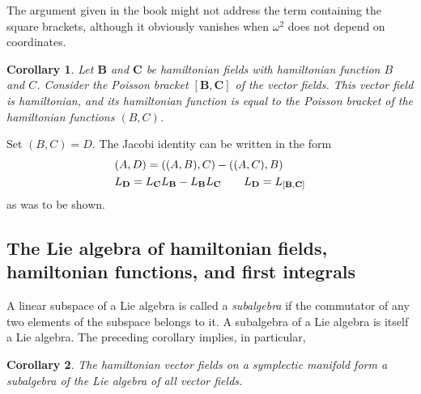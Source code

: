 \documentclass[leqno]{book}
\numberwithin{equation}{section}
\theoremstyle{plain}
\newtheorem{cor}{Corollary}
\let\oldendproof\endproof
\renewenvironment{proof}[1][\proofname]{%
  \oldproof[\textsc{#1}]%
}{\oldendproof}
\theoremstyle{definition}
\theoremstyle{remark}
\theoremstyle{smallcap}
\numberwithin{prob}{section}
\begin{document}
\begin{proof}[Proof of the Jacobi identity]
{    The argument given in the book might not address the term
    containing the square brackets,
    although it obviously vanishes when $\omega^2$ does not depend on
    coordinates.
  }
\end{proof}

\begin{cor}
  Let $\mathbf B$ and $\mathbf C$ be hamiltonian fields
  with hamiltonian function $B$ and $C$.
  Consider the Poisson bracket $[\mathbf B, \mathbf C]$
  of the vector fields.
  This vector field is hamiltonian,
  and its hamiltonian function is equal to the Poisson bracket
  of the hamiltonian functions $(B, C)$.
\end{cor}

\begin{proof}
  Set $(B, C) = D$.
  The Jacobi identity can be written in the form
  \begin{align}
    &(A, D) = ((A, B), C) - ((A, C), B)
    \label{eq:jacobi_D} \\
    &L_\mathbf{D} = L_\mathbf{C} L_\mathbf{B} - L_\mathbf{B} L_\mathbf{C}
    \qquad L_\mathbf{D} = L_{[\mathbf B, \mathbf C]}
    \notag
  \end{align}
  as was to be shown.

\end{proof}


\subsection{The Lie algebra of hamiltonian fields,
hamiltonian functions, and first integrals}

A linear subspace of a Lie algebra is called a \emph{subalgebra}
if the commutator of any two elements of the subspace
belongs to it.
%
A subalgebra of a Lie algebra is itself a Lie algebra.
%
The preceding corollary implies, in particular,

\begin{cor}
  The hamiltonian vector fields on a symplectic manifold
  form a subalgebra of the Lie algebra of all vector fields.
\end{cor}
\end{document}
